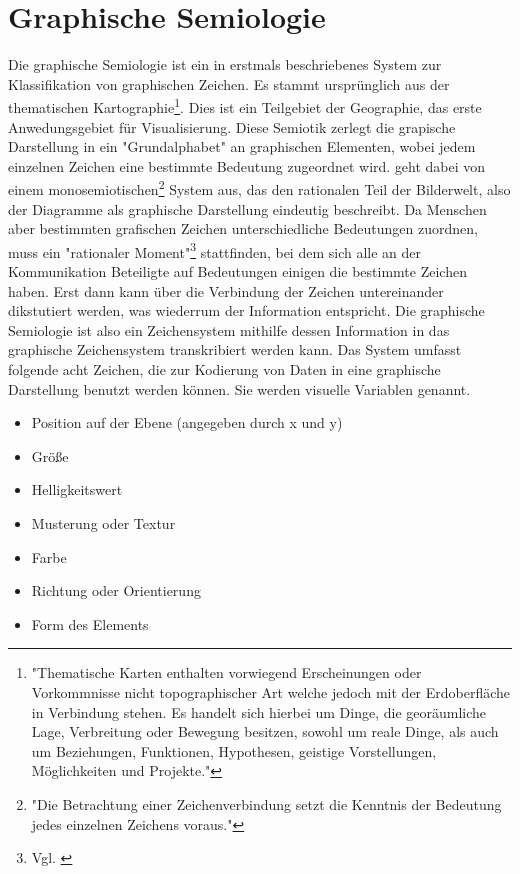 \documentclass[a4paper, 12pt, DIVcalc, onepage, pdftex, headsepline, footsepline]{scrreprt}
\begin{document}
\section{Graphische Semiologie}
\label{sec:graphischeSemiologie}
Die graphische Semiologie ist ein in \cite{Bertin} erstmals beschriebenes System zur Klassifikation von graphischen Zeichen.
Es stammt ursprünglich aus der thematischen Kartographie\footnote{"Thematische Karten enthalten vorwiegend
Erscheinungen oder Vorkommnisse nicht topographischer Art welche jedoch mit der Erdoberfläche in Verbindung
stehen. Es handelt sich hierbei um Dinge, die georäumliche Lage, Verbreitung oder Bewegung besitzen, sowohl
um reale Dinge, als auch um Beziehungen, Funktionen, Hypothesen, geistige Vorstellungen, Möglichkeiten und
Projekte."\citep{Gitta} }. Dies ist ein Teilgebiet der Geographie, das erste Anwedungsgebiet für
Visualisierung.
Diese Semiotik zerlegt die grapische Darstellung in ein "Grundalphabet" an graphischen Elementen, wobei
jedem einzelnen Zeichen eine bestimmte Bedeutung zugeordnet wird. \citep{Bertin} geht dabei von einem
monosemiotischen\footnote{"Die Betrachtung einer Zeichenverbindung setzt die Kenntnis der Bedeutung jedes
einzelnen Zeichens voraus."\citep[S.\,3]{Bertin}} System aus, das den rationalen Teil der Bilderwelt, also der Diagramme
als graphische Darstellung eindeutig beschreibt.
Da Menschen aber bestimmten grafischen Zeichen unterschiedliche Bedeutungen zuordnen, muss ein "rationaler Moment"\footnote{Vgl.
\citep{Bertin}} stattfinden, bei dem sich alle an der Kommunikation Beteiligte auf Bedeutungen einigen
die bestimmte Zeichen haben. Erst dann kann über die Verbindung der Zeichen untereinander dikstutiert
werden, was wiederrum der Information entspricht.
Die graphische Semiologie ist also ein Zeichensystem mithilfe dessen Information in das graphische Zeichensystem
transkribiert werden kann.
Das System umfasst folgende acht Zeichen, die zur Kodierung von Daten in eine graphische Darstellung benutzt
werden können. Sie werden visuelle Variablen genannt.
\begin{itemize}
\item Position auf der Ebene (angegeben durch x und y)
\item Größe
\item Helligkeitswert
\item Musterung oder Textur
\item Farbe
\item Richtung oder Orientierung
\item Form des Elements
\end{itemize}
\end{document}
